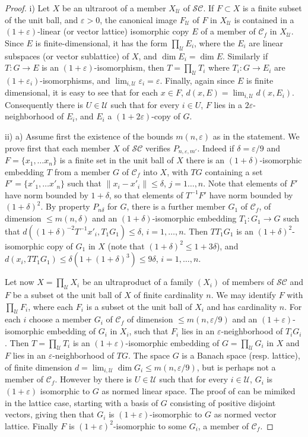 \documentclass[11pt]{amsart}
\theoremstyle{plain}
\theoremstyle{remark}
\newcommand{\C}{\mathcal C}
\newcommand{\U}{\mathcal U}
\newcommand{\eps}{\varepsilon}
\begin{document}
\begin{proof}
i) Let $X$ be an ultraroot of a member $X_\U$ of $\mathcal{SC}$. If $F\subset X$ is a finite subset of the unit ball, and $\eps>0$, the canonical image $F_\U$ of $F$ in $X_\U$ is contained in a $(1+\eps)$-linear (or vector lattice) isomorphic copy $E$ of a member of $\C_f$ in $X_\U$. Since $E$ is finite-dimensional, it has the form $\prod_\U E_i$, where the $E_i$ are linear subspaces (or vector sublattice) of $X$, and $\dim E_i=\dim E$. Similarly if $T: G\to E$ is an $(1+\eps)$-isomorphism, then $T=\prod_\U T_i$ where $T_i:G\to E_i$ are $(1+\eps_i)$-isomorphisms, and $\lim_{i,\U} \eps_i=\eps$. Finally, again since $E$ is finite dimensional, it is easy to see that for each $x\in F$, $d(x,E)=\lim_{i,\U} d(x,E_i)$. Consequently there is $U\in\U$ such that for every $i\in U$, $F$ lies in a $2\eps$-neighborhood of $E_i$, and $E_i$ a $(1+2\eps)$-copy of $G$.

ii) a) Assume first the existence of the bounds $m(n,\eps)$ as in the statement. We prove first that each member $X$ of $\mathcal{SC}$  verifies $P_{n,\eps,m'}$. Indeed if $\delta=\eps/9$ and $F=\{x_1,\dots x_n\}$ is a finite set in the unit ball of $X$ there is an $(1+\delta)$-isomorphic embedding $T$ from a member $G$ of $\C_f$ into $X$, with $TG$ containing a set $F'=\{x'_1,\dots x'_n\}$ such that  $\|x_i-x'_i\|\le \delta$, $j=1\dots,n$. Note that elements of $F'$ have norm bounded by $1+\delta$, so that elements of $T^{-1}F'$ have norm bounded by $(1+\delta)^2$. By property $P_{n\delta}$ for $G$, there is a further member $G_1$ of $\C_f$, of dimension $\le m(n,\delta)$ and an $(1+\delta)$-isomorphic embedding $T_1:G_1\to G$ such that $d((1+\delta)^{-2}T^{-1}x'_i, T_1G_1)\le \delta$, $i=1,\dots,n$. Then $TT_1G_1$ is an $(1+\delta)^2$-isomorphic copy of $G_1$ in $X$ (note that $(1+\delta)^2\le 1+3\delta$), and $d(x_i,TT_1G_1)\le\delta(1+(1+\delta)^3)\le 9\delta$, $i=1,\dots,n$.

Let now $X=\prod_\U X_i$ be an ultraproduct of a family $(X_i)$ of members of $\mathcal{SC}$ and $F$ be a subset ot the unit ball of $X$ of finite cardinality $n$. We may identify $F$ with $\prod_\U F_i$, where each $F_i$ is a subset ot the unit ball of $X_i$ and has cardinality $n$. For each $i$ choose a member $G_i$ of $\C_f$ of dimension $\le m(n,\eps/9)$ and an $(1+\eps)$-isomorphic embedding of $G_i$ in $X_i$, such that $F_i$ lies in an $\eps$-neighborhood of $T_iG_i$. Then $T=\prod_\U T_i$ is an $(1+\eps)$-isomorphic embedding of $G=\prod_\U G_i$ in $X$ and $F$ lies in an $\eps$-neighborhood of $TG$. The space $G$ is a Banach space (resp. lattice), of finite dimension $d=\lim_{i,\U}\dim G_i\le m(n,\eps/9)$, but is perhaps not a member of $\C_f$. However by \cite[prop 6.1]{H} there is $U\in \U$ such that for every $i\in\U$, $G_i$ is $(1+\eps)$ isomorphic to $G$ as normed linear space. The proof of \cite[prop 6.1]{H} can be mimiked in the lattice case, starting with a  basis of $G$ consisting of positive disjoint vectors, giving then that $G_i$ is $(1+\eps)$-isomorphic to $G$ as normed vector lattice. Finally $F$ is $(1+\eps)^2$-isomorphic to some $G_i$, a member of $\C_f$.


\end{proof}
\end{document}
